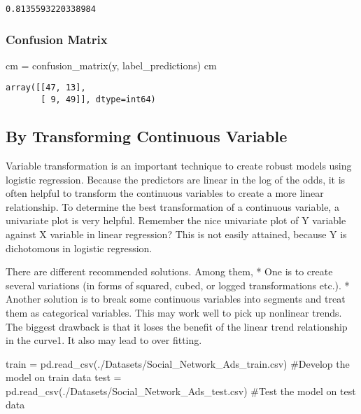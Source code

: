 \documentclass[
  letterpaper,
  DIV=11,
  numbers=noendperiod]{scrreprt}
\newenvironment{Shaded}{\begin{snugshade}}{\end{snugshade}}
\newcommand{\CommentTok}[1]{\textcolor[rgb]{0.37,0.37,0.37}{#1}}
\newcommand{\NormalTok}[1]{\textcolor[rgb]{0.00,0.23,0.31}{#1}}
\newcommand{\OperatorTok}[1]{\textcolor[rgb]{0.37,0.37,0.37}{#1}}
\newcommand{\StringTok}[1]{\textcolor[rgb]{0.13,0.47,0.30}{#1}}
\begin{document}
\begin{verbatim}
0.8135593220338984
\end{verbatim}

\subsubsection{Confusion Matrix}\label{confusion-matrix}

\begin{Shaded}
\begin{Highlighting}[]
\NormalTok{cm }\OperatorTok{=}\NormalTok{ confusion\_matrix(y, label\_predictions)}
\NormalTok{cm}
\end{Highlighting}
\end{Shaded}

\begin{verbatim}
array([[47, 13],
       [ 9, 49]], dtype=int64)
\end{verbatim}

\subsection{By Transforming Continuous
Variable}\label{by-transforming-continuous-variable}

Variable transformation is an important technique to create robust
models using logistic regression. Because the predictors are linear in
the log of the odds, it is often helpful to transform the continuous
variables to create a more linear relationship. To determine the best
transformation of a continuous variable, a univariate plot is very
helpful. Remember the nice univariate plot of Y variable against X
variable in linear regression? This is not easily attained, because Y is
dichotomous in logistic regression.

There are different recommended solutions. Among them, * One is to
create several variations (in forms of squared, cubed, or logged
transformations etc.). * Another solution is to break some continuous
variables into segments and treat them as categorical variables. This
may work well to pick up nonlinear trends. The biggest drawback is that
it loses the benefit of the linear trend relationship in the curve1. It
also may lead to over fitting.

\begin{Shaded}
\begin{Highlighting}[]
\NormalTok{train }\OperatorTok{=}\NormalTok{ pd.read\_csv(}\StringTok{\textquotesingle{}./Datasets/Social\_Network\_Ads\_train.csv\textquotesingle{}}\NormalTok{) }\CommentTok{\#Develop the model on train data}
\NormalTok{test }\OperatorTok{=}\NormalTok{ pd.read\_csv(}\StringTok{\textquotesingle{}./Datasets/Social\_Network\_Ads\_test.csv\textquotesingle{}}\NormalTok{) }\CommentTok{\#Test the model on test data}
\end{Highlighting}
\end{Shaded}
\end{document}
